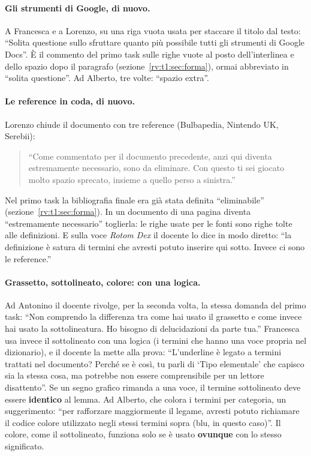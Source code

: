 \paragraph{Gli strumenti di Google, di nuovo.} A Francesca e a Lorenzo, su
una riga vuota usata per staccare il titolo dal testo: ``Solita questione
sullo sfruttare quanto più possibile tutti gli strumenti di Google Docs''. È il
commento del primo task sulle righe vuote al posto dell'interlinea e dello
spazio dopo il paragrafo (sezione~\ref{rv:t1:sec:forma}), ormai abbreviato in
``solita questione''. Ad Alberto, tre volte: ``spazio extra''.

\paragraph{Le reference in coda, di nuovo.} Lorenzo chiude il documento con
tre reference (Bulbapedia, Nintendo UK, Serebii):
\begin{quote}
  ``Come commentato per il documento precedente, anzi qui diventa
  estremamente necessario, sono da eliminare. Con questo ti sei giocato molto
  spazio sprecato, insieme a quello perso a sinistra.''
\end{quote}
Nel primo task la bibliografia finale era già stata definita ``eliminabile''
(sezione~\ref{rv:t1:sec:forma}). In un documento di una pagina diventa
``estremamente necessario'' toglierla: le righe usate per le fonti sono righe
tolte alle definizioni. E sulla voce \emph{Rotom Dex} il docente lo dice in
modo diretto: ``la definizione è satura di termini che avresti potuto
inserire qui sotto. Invece ci sono le reference.''

\paragraph{Grassetto, sottolineato, colore: con una logica.} Ad Antonino il
docente rivolge, per la seconda volta, la stessa domanda del primo task:
``Non comprendo la differenza tra come hai usato il grassetto e come invece
hai usato la sottolineatura. Ho bisogno di delucidazioni da parte tua.''
Francesca usa invece il sottolineato con una logica (i termini che hanno una
voce propria nel dizionario), e il docente la mette alla prova: ``L'underline
è legato a termini trattati nel documento? Perché se è così, tu parli di
`Tipo elementale' che capisco sia la stessa cosa, ma potrebbe non essere
comprensibile per un lettore disattento''. Se un segno grafico rimanda a una
voce, il termine sottolineato deve essere \textbf{identico} al lemma. Ad
Alberto, che colora i termini per categoria, un suggerimento: ``per rafforzare
maggiormente il legame, avresti potuto richiamare il codice colore utilizzato
negli stessi termini sopra (blu, in questo caso)''. Il colore, come il
sottolineato, funziona solo se è usato \textbf{ovunque} con lo stesso
significato.

